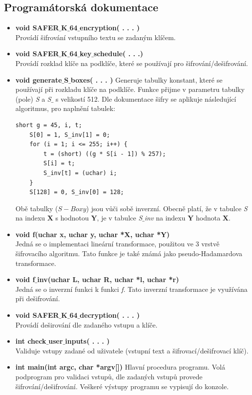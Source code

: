 \documentclass[12pt,a4paper]{article}
\begin{document}
{\subsection{Programátorská dokumentace}}
\begin{itemize}


\item \textbf{void SAFER$\_$K$\_$64$\_$encryption( . . . )} \\
Provádí šifrování vstupního textu se zadaným klíčem. 


\item \textbf{void SAFER$\_$K$\_$64$\_$key$\_$schedule( . . .)} \\
Provádí rozklad klíče na podklíče, které se používají pro šifrování/dešifrování.


\item \textbf{void generate$\_$S$\_$boxes( . . . )}
Generuje tabulky konstant, které se používají při rozkladu klíče na podklíče. Funkce přijme v parametru tabulky (pole) \emph{S} a \emph{S$\_$} s velikostí 512. 
Dle dokumentace šifry se aplikuje následující algoritmus, pro naplnění tabulek:
\lstset{language=C} %
\begin{lstlisting}[frame=single]
	short g = 45, i, t;
	S[0] = 1, S_inv[1] = 0;
	for (i = 1; i <= 255; i++) {
		t = (short) ((g * S[i - 1]) % 257);
		S[i] = t;
		S_inv[t] = (uchar) i;
	}
	S[128] = 0, S_inv[0] = 128;
\end{lstlisting}
Obě tabulky ($S-Boxy$) jsou vůči sobě inverzní. Obecně platí, že v tabulce \emph{S} na indexu $\textbf{X}$ s hodnotou $\textbf{Y}$, je v tabulce \emph{S$\_$inv }na indexu $\textbf{Y}$ hodnota $\textbf{X}$. 

\item \textbf{void f(uchar x, uchar y, uchar *X, uchar *Y)}\\
Jedná se o implementaci lineární transformace, použitou ve 3 vrstvě šifrovacího algoritmu. Tato funkce je také známá jako pseudo-Hadamardova transformace.

\item \textbf{void f$\_$inv(uchar L, uchar R, uchar *l, uchar *r)} \\
Jedná se o inverzní funkci k funkci \textit{f}. Tato inverzní transformace je využívána při dešifrování.

\item \textbf{void SAFER$\_$K$\_$64$\_$decryption( . . . )}\\
Provádí deširování dle zadaného vstupu a klíče.

\item \textbf{int check$\_$user$\_$inputs( . . . )} \\
Validuje vstupy zadané od uživatele (vstupní text a šifrovací/dešifrovací klíč).

\item \textbf{int main(int argc, char *argv[]) }
Hlavní procedura programu. Volá podprogram pro validaci vstupů, dle zadaných vstupů provede šifrování/dešifrování. Veškeré výstupy programu se vypisují do konzole.

\end{itemize}
\end{document}
